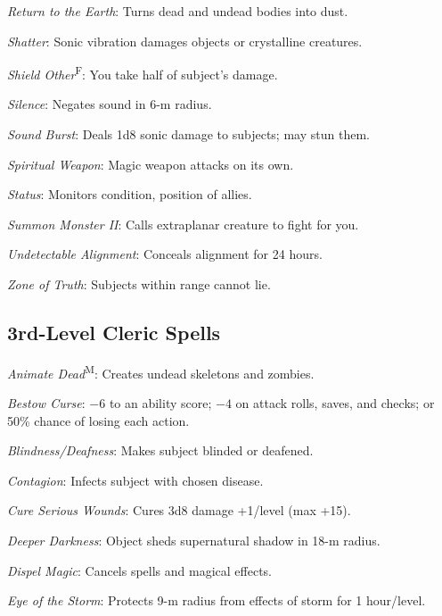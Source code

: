 \textit{Return to the Earth}: Turns dead and undead bodies into dust.

\textit{Shatter}: Sonic vibration damages objects or crystalline creatures.

\textit{Shield Other}\textsuperscript{F}: You take half of subject's damage.

\textit{Silence}: Negates sound in 6-m radius.

\textit{Sound Burst}: Deals 1d8 sonic damage to subjects; may stun them.

\textit{Spiritual Weapon}: Magic weapon attacks on its own.

\textit{Status}: Monitors condition, position of allies.

\textit{Summon Monster II}: Calls extraplanar creature to fight for you.

\textit{Undetectable Alignment}: Conceals alignment for 24 hours.

\textit{Zone of Truth}: Subjects within range cannot lie.



\subsection{3rd-Level Cleric Spells}

\textit{Animate Dead}\textsuperscript{M}: Creates undead skeletons and zombies.

\textit{Bestow Curse}: $-6$ to an ability score; $-4$ on attack rolls, saves, and checks; or 50\% chance of losing each action.

\textit{Blindness/Deafness}: Makes subject blinded or deafened.

\textit{Contagion}: Infects subject with chosen disease.



\textit{Cure Serious Wounds}: Cures 3d8 damage +1/level (max +15).


\textit{Deeper Darkness}: Object sheds supernatural shadow in 18-m radius.

\textit{Dispel Magic}: Cancels spells and magical effects.

\textit{Eye of the Storm}: Protects 9-m radius from effects of storm for 1 hour/level.

